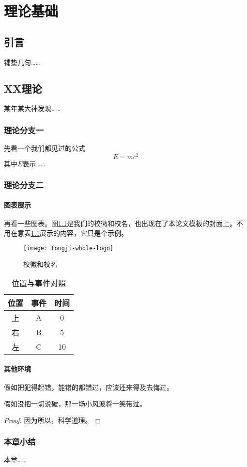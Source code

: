 \chapter{理论基础}
\label{chap:basis}

\section{引言}

铺垫几句……

\section{XX理论}

某年某大神发现……

\subsection{理论分支一}

先看一个我们都见过的公式
\begin{equation}
	E = m c^2
\end{equation}
其中$E$表示……

\subsection{理论分支二}

\subsubsection{图表展示}

再看一些图表。图\ref{fig:logo}是我们的校徽和校名，也出现在了本论文模板的封面上。不用在意表\ref{tab:events}展示的内容，它只是个示例。
\begin{figure}[!h]
	\centering
	\texttt{[image: tongji-whole-logo]}
	\caption{校徽和校名}
	\label{fig:logo}
\end{figure}

\begin{table}[!htbp]
	\centering
	\caption{位置与事件对照}
	\label{tab:events}
	\begin{tabular}{ccc}
		\toprule
		位置 & 事件 & 时间\\
		\midrule
		上 & A & 0 \\
		右 & B & 5 \\
		左 & C & 10 \\
		\bottomrule
	\end{tabular}
\end{table}

\subsubsection{其他环境}

\begin{assumption}
	假如把犯得起错，能错的都错过，应该还来得及去悔过。

	假如没把一切说破，那一场小风波将一笑带过。
\end{assumption}

\begin{proof}
	因为所以，科学道理。
\end{proof}

\subsection{本章小结}
本章……
